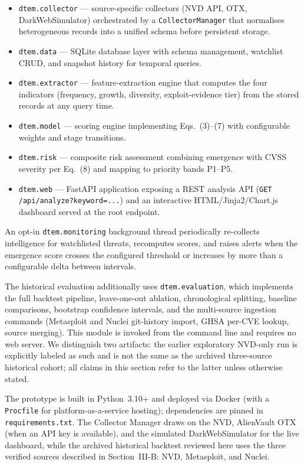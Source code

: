 \documentclass[conference]{IEEEtran}
\begin{document}
\begin{itemize}
\item \texttt{dtem.collector} --- source-specific collectors (NVD API, OTX, DarkWebSimulator) orchestrated by a \texttt{CollectorManager} that normalises heterogeneous records into a unified schema before persistent storage.
\item \texttt{dtem.data} --- SQLite database layer with schema management, watchlist CRUD, and snapshot history for temporal queries.
\item \texttt{dtem.extractor} --- feature-extraction engine that computes the four indicators (frequency, growth, diversity, exploit-evidence tier) from the stored records at any query time.
\item \texttt{dtem.model} --- scoring engine implementing Eqs.~(3)--(7) with configurable weights and stage transitions.
\item \texttt{dtem.risk} --- composite risk assessment combining emergence with CVSS severity per Eq.~(8) and mapping to priority bands P1--P5.
\item \texttt{dtem.web} --- FastAPI application exposing a REST analysis API (\texttt{GET /api/analyze?keyword=...}) and an interactive HTML/Jinja2/Chart.js dashboard served at the root endpoint.
\end{itemize}

An opt-in \texttt{dtem.monitoring} background thread periodically re-collects intelligence for watchlisted threats, recomputes scores, and raises alerts when the emergence score crosses the configured threshold or increases by more than a configurable delta between intervals.

The historical evaluation additionally uses \texttt{dtem.evaluation}, which implements the full backtest pipeline, leave-one-out ablation, chronological splitting, baseline comparisons, bootstrap confidence intervals, and the multi-source ingestion commands (Metasploit and Nuclei git-history import, GHSA per-CVE lookup, source merging). This module is invoked from the command line and requires no web server. We distinguish two artifacts: the earlier exploratory NVD-only run is explicitly labeled as such and is not the same as the archived three-source historical cohort; all claims in this section refer to the latter unless otherwise stated.

The prototype is built in Python~3.10+ and deployed via Docker (with a \texttt{Procfile} for platform-as-a-service hosting); dependencies are pinned in \texttt{requirements.txt}. The Collector Manager draws on the NVD, AlienVault OTX (when an API key is available), and the simulated DarkWebSimulator for the live dashboard, while the archived historical backtest reviewed here uses the three verified sources described in Section~III-B: NVD, Metasploit, and Nuclei.
\end{document}
